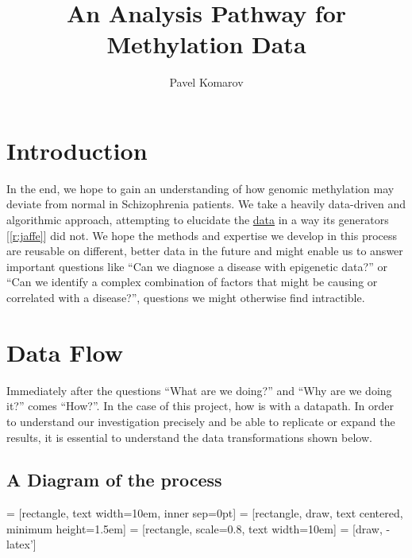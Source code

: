 \documentclass[]{article}
\begin{document}
\title{\vspace{-10mm}An Analysis Pathway for Methylation Data}
\author{Pavel Komarov}
\maketitle
  
  \section{Introduction}
  In the end, we hope to gain an understanding of how genomic methylation may deviate from normal in Schizophrenia patients. We take a heavily data-driven and algorithmic approach, attempting to elucidate the \href{http://www.ncbi.nlm.nih.gov/geo/query/acc.cgi?acc=GSE74193}{data} in a way its generators [\ref{r:jaffe}] did not. We hope the methods and expertise we develop in this process are reusable on different, better data in the future and might enable us to answer important questions like ``Can we diagnose a disease with epigenetic data?'' or ``Can we identify a complex combination of factors that might be causing or correlated with a disease?'', questions we might otherwise find intractible.

  \section{Data Flow}

  Immediately after the questions ``What are we doing?'' and ``Why are we doing it?'' comes ``How?''. In the case of this project, how is with a datapath. In order to understand our investigation precisely and be able to replicate or expand the results, it is essential to understand the data transformations shown below.

  \subsection{A Diagram of the process}
  \vspace{2mm}

   = [rectangle, text width=10em, inner sep=0pt]
   = [rectangle, draw, text centered, minimum height=1.5em]
   = [rectangle, scale=0.8, text width=10em]
   = [draw, -latex']
\end{document}
